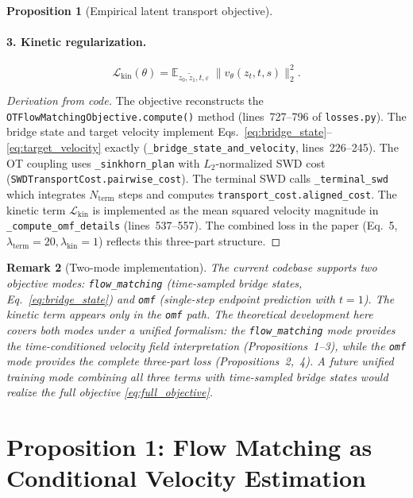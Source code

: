 \documentclass[letterpaper]{article}
\newtheorem{proposition}{Proposition}[section]
\newtheorem{remark}[proposition]{Remark}
\newcommand{\E}{\mathbb{E}}
\newcommand{\cL}{\mathcal{L}}
\begin{document}
\begin{proposition}[Empirical latent transport objective]
\paragraph{3. Kinetic regularization.}
\begin{equation}
    \cL_{\text{kin}}(\theta) = \E_{z_0,\tilde z_1,t,\varepsilon}\; \|v_\theta(z_t, t, s)\|_2^2.
    \label{eq:kinetic}
\end{equation}
\end{proposition}

\begin{proof}[Derivation from code]
The objective reconstructs the \texttt{OTFlowMatchingObjective.compute()} method
(lines~727--796 of \texttt{losses.py}). The bridge state and target velocity
implement Eqs.~\eqref{eq:bridge_state}--\eqref{eq:target_velocity} exactly
(\texttt{\_bridge\_state\_and\_velocity}, lines~226--245). The OT coupling
uses \texttt{\_sinkhorn\_plan} with $L_2$-normalized SWD cost
(\texttt{SWDTransportCost.pairwise\_cost}). The terminal SWD calls
\texttt{\_terminal\_swd} which integrates $N_{\text{term}}$ steps
and computes \texttt{transport\_cost.aligned\_cost}.
The kinetic term $\cL_{\text{kin}}$ is implemented as the mean squared
velocity magnitude in \texttt{\_compute\_omf\_details} (lines~537--557).
The combined loss in the paper (Eq.~5, $\lambda_{\text{term}}=20,\lambda_{\text{kin}}=1$)
reflects this three-part structure.
\end{proof}

\begin{remark}[Two-mode implementation]
The current codebase supports two objective modes: \texttt{flow\_matching}
(time-sampled bridge states, Eq.~\eqref{eq:bridge_state}) and \texttt{omf}
(single-step endpoint prediction with $t=1$). The kinetic term appears only
in the \texttt{omf} path. The theoretical development here covers both modes
under a unified formalism: the \texttt{flow\_matching} mode provides the
time-conditioned velocity field interpretation (Propositions~1--3), while
the \texttt{omf} mode provides the complete three-part loss
(Propositions~2,~4). A future unified training mode combining all three
terms with time-sampled bridge states would realize the full objective
\eqref{eq:full_objective}.
\end{remark}


\section{Proposition 1: Flow Matching as Conditional Velocity Estimation}
\end{document}
